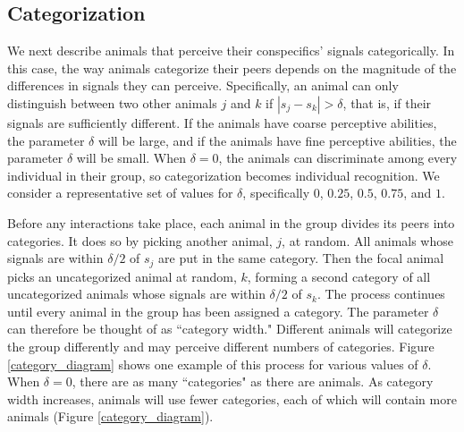 \subsection*{Categorization}
We next describe animals that perceive their conspecifics' signals categorically. In this case, the way animals categorize their peers depends on the magnitude of the differences in signals they can perceive. Specifically, an animal can only distinguish between two other animals $j$ and $k$ if $|s_j-s_k|>\delta$, that is, if their signals are sufficiently different. If the animals have coarse perceptive abilities, the parameter $\delta$ will be large, and if the animals have fine perceptive abilities, the parameter $\delta$ will be small. When $\delta=0$, the animals can discriminate among every individual in their group, so categorization becomes individual recognition. We consider a representative set of values for $\delta$, specifically $0$, $0.25$, $0.5$, $0.75$, and $1$.

Before any interactions take place, each animal in the group divides its peers into categories. It does so by picking another animal, $j$, at random. All animals whose signals are within $\delta/2$ of $s_j$ are put in the same category. Then the focal animal picks an uncategorized animal at random, $k$, forming a second category of all uncategorized animals whose signals are within $\delta/2$ of $s_k$. The process continues until every animal in the group has been assigned a category. The parameter $\delta$ can therefore be thought of as ``category width."  Different animals will categorize the group differently and may perceive different numbers of categories. Figure \ref{category_diagram} shows one example of this process for various values of $\delta$. When $\delta=0$, there are as many ``categories" as there are animals. As category width increases, animals will use fewer categories, each of which will contain more animals  (Figure \ref{category_diagram}). 

